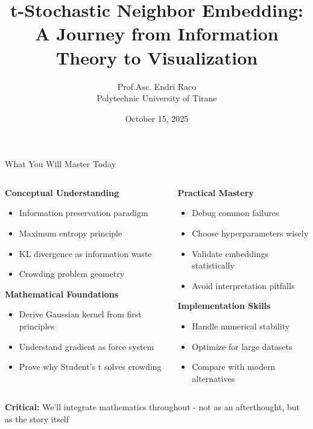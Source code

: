 \documentclass[10pt]{beamer}
\title[t-SNE]{t-Stochastic Neighbor Embedding:\\A Journey from Information Theory to Visualization}
\author[Prof. Raco]{Prof.Asc. Endri Raco\\Polytechnic University of Tirane}
\institute[UPC]{Advanced Multivariate Analysis\\Polytechnic University of Catalonia}
\date{October 15, 2025}
\newcommand{\emphtext}[1]{\textcolor{upcblue}{\textbf{#1}}}
\newcommand{\warningbox}[1]{\colorbox{red!10}{\begin{minipage}{0.85\textwidth}\centering #1\end{minipage}}}
\begin{document}
\begin{frame}[plain]
\titlepage
\end{frame}

\begin{frame}{What You Will Master Today}
\vspace{-0.2cm}
\begin{columns}[T]
\begin{column}{0.48\textwidth}
\emphtext{Conceptual Understanding}
\begin{itemize}
\footnotesize
\item Information preservation paradigm
\item Maximum entropy principle
\item KL divergence as information waste
\item Crowding problem geometry
\end{itemize}

\vspace{0.3cm}
\emphtext{Mathematical Foundations}
\begin{itemize}
\footnotesize
\item Derive Gaussian kernel from first principles
\item Understand gradient as force system
\item Prove why Student's t solves crowding
\end{itemize}
\end{column}

\begin{column}{0.48\textwidth}
\emphtext{Practical Mastery}
\begin{itemize}
\footnotesize
\item Debug common failures
\item Choose hyperparameters wisely
\item Validate embeddings statistically
\item Avoid interpretation pitfalls
\end{itemize}

\vspace{0.3cm}
\emphtext{Implementation Skills}
\begin{itemize}
\footnotesize
\item Handle numerical stability
\item Optimize for large datasets
\item Compare with modern alternatives
\end{itemize}
\end{column}
\end{columns}

\vspace{0.3cm}
\begin{center}
\warningbox{\footnotesize\textbf{Critical:} We'll integrate mathematics throughout - not as an afterthought, but as the story itself}
\end{center}
\end{frame}
\end{document}
